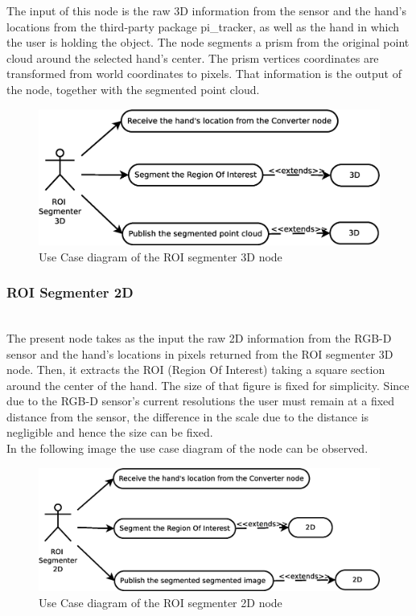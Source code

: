 	The input of this node is the raw 3D information from the sensor and the hand's locations from the third-party package pi\_tracker, as well as the hand in which the user is holding the object. The node segments a prism from the original point cloud around the selected hand's center. The prism vertices coordinates are transformed from world coordinates to pixels. That information is the output of the node, together with the segmented point cloud. 

	\begin{figure}[H]
		\centering
	\includegraphics[scale=0.4]{img/diagrams/uc_roi_segmenter_3d.eps}
		\caption[Use case diagram ROI segmenter 3D node]{Use Case diagram of the ROI segmenter 3D node}
		
	\end{figure}
 
\subsubsection{ROI Segmenter 2D}\\
	\label{roi_segmenter_2d}
	The present node takes as the input the raw 2D information from the RGB-D sensor and the hand's locations in pixels returned from the ROI segmenter 3D node. Then, it extracts the ROI (Region Of Interest) taking a square section around the center of the hand. The size of that figure is fixed for simplicity. Since due to the RGB-D sensor's current resolutions the user must remain at a fixed distance from the sensor, the difference in the scale due to the distance is negligible and hence the size can be fixed. 
	\\

	In the following image the use case diagram of the node can be observed.
	\begin{figure}[H]
		\centering
			\includegraphics[scale=0.4]{img/diagrams/uc_roi_segmenter_2d.eps}
			\caption[Use case diagram ROI segmenter 2D node]{Use Case diagram of the ROI segmenter 2D node}
		
	\end{figure}


